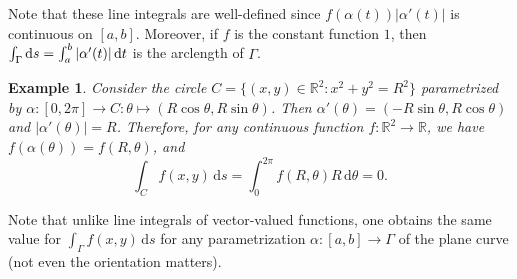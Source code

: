 \documentclass[10pt]{article}
\newcommand{\R}{\mathbb{R}}
\newcommand{\dd}{\,\mathrm{d}}
\theoremstyle{newstyle}
\newtheorem{exmp}[thm]{Example}
\begin{document}
Note that these line integrals are well-defined since $f(\alpha(t)) |\alpha'(t)|$ is continuous 
on $[a, b]$. Moreover, if $f$ is the constant function $1$, then 
$\int_\Gamma {\rm d}s = \int_a^b |\alpha'(t)| \dd t$ is the arclength of $\Gamma$.

\begin{exmp}
Consider the circle $C = \{(x, y) \in \R^2 : x^2+y^2 = R^2\}$ parametrized by 
$\alpha : [0, 2\pi] \to C : \theta \mapsto (R\cos\theta, R\sin\theta)$. Then 
$\alpha'(\theta) = (-R\sin\theta, R\cos\theta)$ and $|\alpha'(\theta)| = R$. 
Therefore, for any continuous function $f : \R^2 \to \R$, we have 
$f(\alpha(\theta)) = f(R, \theta)$, and 
\[ \int_C f(x, y)\dd s = \int_0^{2\pi} f(R, \theta) R \dd \theta = 0. \]
\end{exmp}

Note that unlike line integrals of vector-valued functions, one obtains the same value 
for $\int_\Gamma f(x, y) \dd s $ for any parametrization $\alpha : [a, b] \to \Gamma$ 
of the plane curve (not even the orientation matters). 
\end{document}
